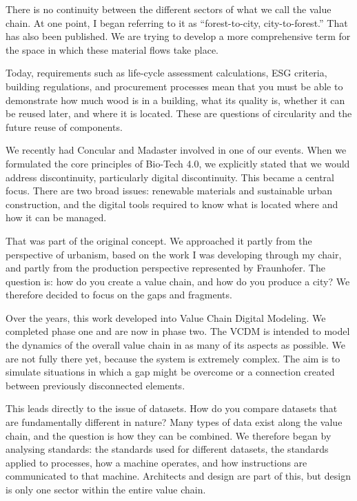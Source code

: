 There is no continuity between the different sectors of what we call the value chain. At one point, I began referring to it as “forest-to-city, city-to-forest.” That has also been published. We are trying to develop a more comprehensive term for the space in which these material flows take place.

Today, requirements such as life-cycle assessment calculations, ESG criteria, building regulations, and procurement processes mean that you must be able to demonstrate how much wood is in a building, what its quality is, whether it can be reused later, and where it is located. These are questions of circularity and the future reuse of components.

We recently had Concular and Madaster involved in one of our events. When we formulated the core principles of Bio-Tech 4.0, we explicitly stated that we would address discontinuity, particularly digital discontinuity. This became a central focus. There are two broad issues: renewable materials and sustainable urban construction, and the digital tools required to know what is located where and how it can be managed.

That was part of the original concept. We approached it partly from the perspective of urbanism, based on the work I was developing through my chair, and partly from the production perspective represented by Fraunhofer. The question is: how do you create a value chain, and how do you produce a city? We therefore decided to focus on the gaps and fragments.

Over the years, this work developed into Value Chain Digital Modeling. We completed phase one and are now in phase two. The VCDM is intended to model the dynamics of the overall value chain in as many of its aspects as possible. We are not fully there yet, because the system is extremely complex. The aim is to simulate situations in which a gap might be overcome or a connection created between previously disconnected elements.

This leads directly to the issue of datasets. How do you compare datasets that are fundamentally different in nature? Many types of data exist along the value chain, and the question is how they can be combined. We therefore began by analysing standards: the standards used for different datasets, the standards applied to processes, how a machine operates, and how instructions are communicated to that machine. Architects and design are part of this, but design is only one sector within the entire value chain.

